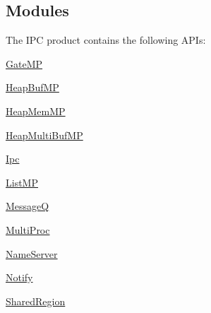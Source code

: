 \hypertarget{index_modules}{}\subsection{Modules}\label{index_modules}
The I\-P\-C product contains the following A\-P\-Is\-:
\begin{DoxyItemize}
\item \hyperlink{_gate_m_p_8h}{Gate\-M\-P}
\item \hyperlink{_heap_buf_m_p_8h}{Heap\-Buf\-M\-P}
\item \hyperlink{_heap_mem_m_p_8h}{Heap\-Mem\-M\-P}
\item \hyperlink{_heap_multi_buf_m_p_8h}{Heap\-Multi\-Buf\-M\-P}
\item \hyperlink{_ipc_8h}{Ipc}
\item \hyperlink{_list_m_p_8h}{List\-M\-P}
\item \hyperlink{_message_q_8h}{Message\-Q}
\item \hyperlink{_multi_proc_8h}{Multi\-Proc}
\item \hyperlink{_name_server_8h}{Name\-Server}
\item \hyperlink{_notify_8h}{Notify}
\item \hyperlink{_shared_region_8h}{Shared\-Region} 
\end{DoxyItemize}